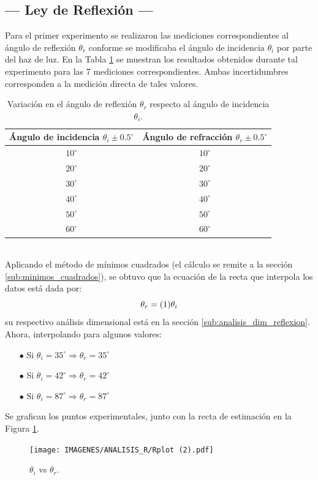 \documentclass[12pt,a4paper]{article}
\begin{document}
\subsection{--- Ley de Reflexión ---} %
\label{sub:ley_reflexion_resul}
Para el primer experimento se realizaron las mediciones correspondientes al ángulo de reflexión $\theta_r$ conforme se modificaba el ángulo de incidencia $\theta_i$ por parte del haz de luz. En la Tabla \ref{tab:exp1} se muestran los resultados obtenidos durante tal experimento para las 7 mediciones correspondientes. Ambas incertidumbres corresponden a la medición directa de tales valores.
\vspace{-8mm}
\begin{table}[ht]
	\footnotesize 
	\centering
	\caption{Variación en el ángulo de reflexión $\theta_r$ respecto al ángulo de incidencia $\theta_i$.}
	\begin{tabular}{cc}
		\hline
		Ángulo de incidencia $\theta_i \pm 0.5^{\circ}$ & Ángulo de refracción $\theta_r \pm 0.5^{\circ}$ \\\hline
		\(10^ \circ \) & \(10^ \circ \) \\ \hline 
		\(20^ \circ \) & \(20^ \circ \) \\ \hline 
		\(30^ \circ \) & \(30^ \circ \) \\ \hline 
		\(40^ \circ \) & \(40^ \circ \) \\ \hline 
		\(50^ \circ \) & \(50^ \circ \) \\ \hline 
		\(60^ \circ \) & \(60^ \circ \) \\ \hline 
	\end{tabular}
	\label{tab:exp1}
\end{table}\\[-3mm]
Aplicando el método de mínimos cuadrados (el cálculo se remite a la sección \ref{sub:minimos_cuadrados}), se obtuvo que la ecuación de la recta que interpola los datos está dada por: \vspace{-2mm}
$$\theta_r=(1)\theta_i\vspace{-3mm}$$
su respectivo análisis dimensional está en la sección \ref{sub:analisis_dim_reflexion}. Ahora, interpolando para algunos valores:
\begin{itemize}[noitemsep]
	\item[$\bullet$] Si $\theta_i=35^{\circ}\Longrightarrow\theta_r=35^{\circ}$
	\item[$\bullet$] Si $\theta_i=42^{\circ}\Longrightarrow\theta_r=42^{\circ}$
	\item[$\bullet$] Si $\theta_i=87^{\circ}\Longrightarrow\theta_r=87^{\circ}$
		\vspace{-2mm}
\end{itemize}
Se grafican los puntos experimentales, junto con la recta de estimación en la Figura \ref{fig:identidad}.
\begin{figure}[ht]
	\centering
	\texttt{[image: IMAGENES/ANALISIS\_R/Rplot (2).pdf]}
	\caption{\(\theta _i\) vs \(\theta _r\).}
	\label{fig:identidad}
\end{figure}
\end{document}
